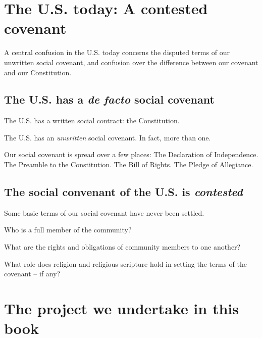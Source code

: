 \documentclass[
]{book}
\begin{document}
\hypertarget{the-u.s.-today-a-contested-covenant}{%
\section{The U.S. today: A contested covenant}\label{the-u.s.-today-a-contested-covenant}}

A central confusion in the U.S. today concerns the disputed terms of our unwritten social covenant, and confusion over the difference between our covenant and our Constitution.

\hypertarget{the-u.s.-has-a-de-facto-social-covenant}{%
\subsection{\texorpdfstring{The U.S. has a \emph{de facto} social covenant}{The U.S. has a de facto social covenant}}\label{the-u.s.-has-a-de-facto-social-covenant}}

The U.S. has a written social contract: the Constitution.

The U.S. has an \emph{unwritten} social covenant. In fact, more than one.

Our social covenant is spread over a few places: The Declaration of Independence. The Preamble to the Constitution. The Bill of Rights. The Pledge of Allegiance.

\hypertarget{the-social-convenant-of-the-u.s.-is-contested}{%
\subsection{\texorpdfstring{The social convenant of the U.S. is \emph{contested}}{The social convenant of the U.S. is contested}}\label{the-social-convenant-of-the-u.s.-is-contested}}

Some basic terms of our social covenant have never been settled.

Who is a full member of the community?

What are the rights and obligations of community members to one another?

What role does religion and religious scripture hold in setting the terms of the covenant -- if any?

\hypertarget{the-project-we-undertake-in-this-book}{%
\section{The project we undertake in this book}\label{the-project-we-undertake-in-this-book}}
\end{document}
